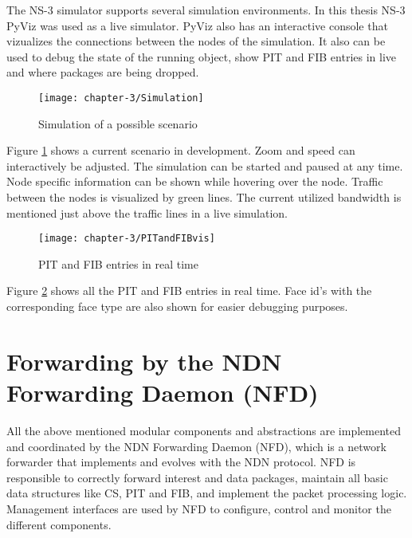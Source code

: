 The NS-3 simulator supports several simulation environments. In this thesis NS-3 PyViz was used as a live simulator. PyViz also has an interactive console that vizualizes the connections between the nodes of the simulation. It also can be used to debug the state of the running object, show PIT and FIB entries in live and where packages are being dropped.

\begin{figure}[H]
  \centering
  \texttt{[image: chapter-3/Simulation]}
  \caption{Simulation of a possible scenario}
  \label{fig:Simulation}
\end{figure}

Figure \ref{fig:Simulation} shows a current scenario in development. Zoom and speed can interactively be adjusted. The simulation can be started and paused at any time. Node specific information can be shown while hovering over the node. Traffic between the nodes is visualized by green lines. The current utilized bandwidth is mentioned just above the traffic lines in a live simulation.

\begin{figure}[H]
  \centering
  \texttt{[image: chapter-3/PITandFIBvis]}
  \caption{PIT and FIB entries in real time}
  \label{fig:PITandFIBvis}
\end{figure}

Figure \ref{fig:PITandFIBvis} shows all the PIT and FIB entries in real time. Face id's with the corresponding face type are also shown for easier debugging purposes.

\section{Forwarding by the NDN Forwarding Daemon (NFD)}

\vspace{5mm} %

All the above mentioned modular components and abstractions are implemented and coordinated by the NDN Forwarding Daemon (NFD), which is a network forwarder that implements and evolves with the NDN protocol. NFD is responsible to correctly forward interest and data packages, maintain all basic data structures like CS, PIT and FIB, and implement the packet processing logic. Management interfaces are used by NFD to configure, control and monitor the different components.

\vspace{5mm} %

